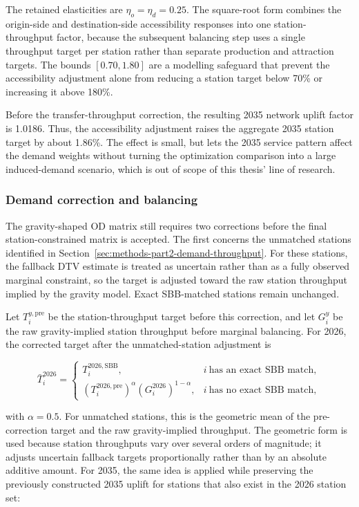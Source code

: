 \documentclass[preprint,12pt]{elsarticle}
\begin{document}
The retained elasticities are \(\eta_o=\eta_d=0.25\). The square-root form combines the origin-side and destination-side accessibility responses into one station-throughput factor, because the subsequent balancing step uses a single throughput target per station rather than separate production and attraction targets. The bounds \([0.70,1.80]\) are a modelling safeguard that prevent the accessibility adjustment alone from reducing a station target below 70\% or increasing it above 180\%.

Before the transfer-throughput correction, the resulting 2035 network uplift factor is 1.0186. Thus, the accessibility adjustment raises the aggregate 2035 station target by about 1.86\%. The effect is small, but lets the 2035 service pattern affect the demand weights without turning the optimization comparison into a large induced-demand scenario, which is out of scope of this thesis' line of research.

\subsubsection{Demand correction and balancing}\label{sec:methods-part2-demand-balancing}
The gravity-shaped OD matrix still requires two corrections before the final station-constrained matrix is accepted. The first concerns the unmatched stations identified in Section~\ref{sec:methods-part2-demand-throughput}. For these stations, the fallback DTV estimate is treated as uncertain rather than as a fully observed marginal constraint, so the target is adjusted toward the raw station throughput implied by the gravity model. Exact SBB-matched stations remain unchanged.

Let \(T_i^{y,\mathrm{pre}}\) be the station-throughput target before this correction, and let \(G_i^y\) be the raw gravity-implied station throughput before marginal balancing. For 2026, the corrected target after the unmatched-station adjustment is

\begin{equation}
\bar T_i^{2026}
=
\begin{cases}
T_i^{2026,\mathrm{SBB}}, & i\ \text{has an exact SBB match},\\[4pt]
\left(T_i^{2026,\mathrm{pre}}\right)^\alpha
\left(G_i^{2026}\right)^{1-\alpha}, & i\ \text{has no exact SBB match},
\end{cases}
\label{eq:part2-unmatched-target-blend}
\end{equation}

with \(\alpha=0.5\). For unmatched stations, this is the geometric mean of the pre-correction target and the raw gravity-implied throughput. The geometric form is used because station throughputs vary over several orders of magnitude; it adjusts uncertain fallback targets proportionally rather than by an absolute additive amount. For 2035, the same idea is applied while preserving the previously constructed 2035 uplift for stations that also exist in the 2026 station set:
\end{document}
